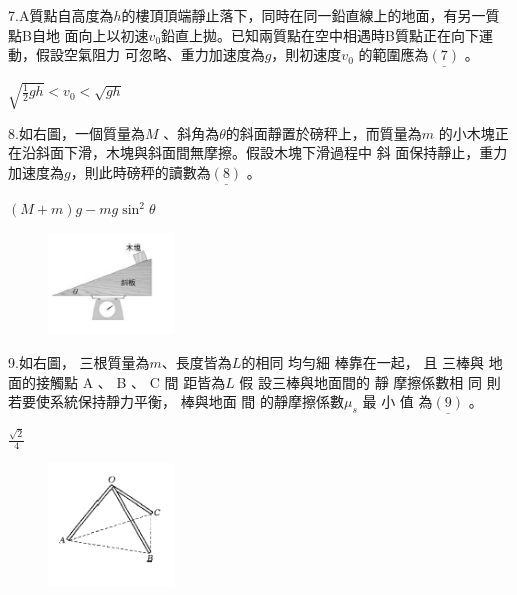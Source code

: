 \documentclass[cn,10pt,math=newtx,chinesefont=founder,device=ig]{elegantbook}
\begin{document}
\begin{example}
   7.A質點自高度為$h$的樓頂頂端靜止落下，同時在同一鉛直線上的地面，有另一質點B自地
面向上以初速$v_0$鉛直上拋。已知兩質點在空中相遇時B質點正在向下運動，假設空氣阻力
可忽略、重力加速度為$ g$，則初速度$v_0$ 的範圍應為$\underline{(7)}$ 。
\\
    \rightline{[文華高中教甄109]}
\end{example}
\begin{solution}
    $\sqrt{\frac{1}{2} gh} < v_0 < \sqrt{gh}$
\end{solution}

\newpage


\begin{example}
   8.如右圖，一個質量為$ M$ 、斜角為$\theta$的斜面靜置於磅秤上，而質量為$m$ 的小木塊正在沿斜面下滑，木塊與斜面間無摩擦。假設木塊下滑過程中 斜
面保持靜止，重力加速度為$ g$，則此時磅秤的讀數為$\underline{(8)}$ 。
\\
    \rightline{[文華高中教甄109]}
\end{example}
\begin{solution}
    $(M+m)g-mg\sin^2 {\theta}$
\end{solution}
\begin{figure}[htbp]
    \flushright
    \includegraphics[width=0.3\textwidth]{image/109文華8.png}
  \end{figure}
\newpage


\begin{example}
   9.如右圖， 三根質量為$m$、長度皆為$L$的相同 均勻細 棒靠在一起， 且 三棒與
地面的接觸點 A 、 B 、 C 間 距皆為$L$ 假 設三棒與地面間的 靜 摩擦係數相
同 則 若要使系統保持靜力平衡， 棒與地面 間 的靜摩擦係數$\mu_s$ 最 小
值 為$\underline{(9)}$ 。
\\
    \rightline{[文華高中教甄109]}
\end{example}
\begin{solution}
    $\frac{\sqrt{2}} {4}$
\end{solution}
\begin{figure}[htbp]
    \flushright
    \includegraphics[width=0.3\textwidth]{image/109文華9.png}
  \end{figure}
\newpage
\end{document}
